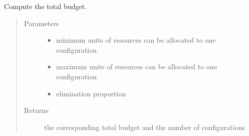 \documentclass[letterpaper,10pt,english]{sphinxmanual}
\begin{document}

\begin{fulllineitems}
\label{\detokenize{index:utils.build}}
\end{fulllineitems}


\begin{fulllineitems}
\label{\detokenize{index:utils.cum_max}}
\end{fulllineitems}


\begin{fulllineitems}
\label{\detokenize{index:utils.get_budget}}
Compute the total budget.
\begin{quote}\begin{description}
\item[{Parameters}] \leavevmode\begin{itemize}
\item {} 
 \textendash{} minimum units of resources can be allocated to one configuration

\item {} 
 \textendash{} maximum units of resources can be allocated to one configuration

\item {} 
 \textendash{} elimination proportion

\end{itemize}

\item[{Returns}] \leavevmode
the corresponding total budget and the number of configurations

\end{description}\end{quote}

\end{fulllineitems}

\end{document}
